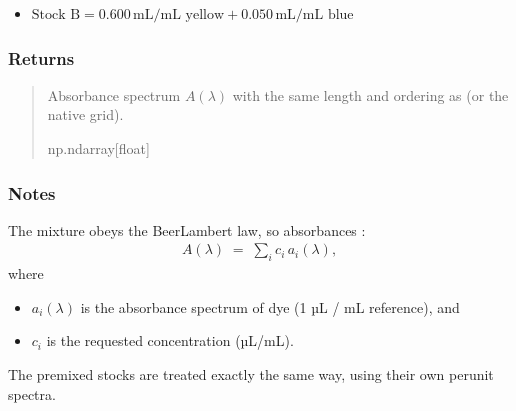 \documentclass[letterpaper,10pt,english]{sphinxmanual}
\begin{document}
\begin{fulllineitems}
\begin{itemize}
\item {} 
\sphinxAtStartPar
\(\text{Stock B}=0.600\,\text{mL/mL yellow}
+ 0.050\,\text{mL/mL blue}\)

\end{itemize}


\subsubsection{Returns}
\label{\detokenize{generated/photon_canon.contrib.food_coloring:returns}}\begin{quote}\begin{description}
\sphinxAtStartPar
Absorbance spectrum \(A(\lambda)\) with the same length and ordering as  (or the native grid).

\sphinxAtStartPar
np.ndarray{[}float{]}

\end{description}\end{quote}


\subsubsection{Notes}
\label{\detokenize{generated/photon_canon.contrib.food_coloring:notes}}
\sphinxAtStartPar
The mixture obeys the Beer\textendash{}Lambert law, so absorbances :
\begin{equation*}
\begin{split}A(\lambda) \;=\;
\sum_{i} c_i\,a_i(\lambda),\end{split}
\end{equation*}
\sphinxAtStartPar
where
\begin{itemize}
\item {} 
\sphinxAtStartPar
\(a_i(\lambda)\) is the  absorbance spectrum of dye
 (1 µL / mL reference), and

\item {} 
\sphinxAtStartPar
\(c_i\) is the requested concentration (µL/mL).

\end{itemize}

\sphinxAtStartPar
The premixed stocks are treated exactly the same way, using their
own per\sphinxhyphen{}unit spectra.



\end{fulllineitems}
\end{document}
